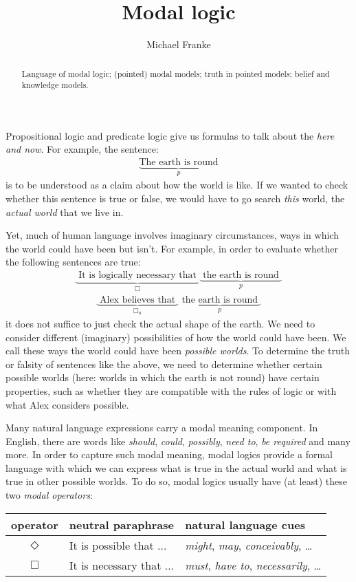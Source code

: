 \documentclass[nobib,nofonts]{tufte-handout}
\title{Modal logic}
\author{Michael Franke}
\date{} %
\begin{document}
\maketitle

\begin{abstract}
\noindent
Language of modal logic;
(pointed) modal models;
truth in pointed models;
belief and knowledge models.
\end{abstract}

\noindent Propositional logic and predicate logic give us formulas to talk about the \emph{here and now}.
For example, the sentence:
%
\begin{align*}
  \underbrace{\text{The earth is round}}_{p}
\end{align*}
%
is to be understood as a claim about how the world is like.
If we wanted to check whether this sentence is true or false, we would have to go search \emph{this} world, the \emph{actual world} that we live in.

Yet, much of human language involves imaginary circumstances, ways in which the world could have been but isn't.
For example, in order to evaluate whether the following sentences are true:
\begin{align*}
  \underbrace{\text{ It is logically necessary that }}_{\Box}
  \underbrace{\text{ the earth is round }}_{p}
\end{align*}
\begin{align*}
  \underbrace{\text{ Alex believes that }}_{\Box_{a}}
  \underbrace{\text{ the earth is round }}_{p}
\end{align*}
it does not suffice to just check the actual shape of the earth.
We need to consider different (imaginary) possibilities of how the world could have been.
We call these ways the world could have been \emph{possible worlds}.
To determine the truth or falsity of sentences like the above, we need to determine whether certain possible worlds (here: worlds in which the earth is not round) have certain properties, such as whether they are compatible with the rules of logic or with what Alex considers possible.

Many natural language expressions carry a modal meaning component.
In English, there are words like \emph{should}, \emph{could}, \emph{possibly}, \emph{need to}, \emph{be required} and many more.
In order to capture such modal meaning, modal logics provide a formal language with which we can express what is true in the actual world and what is true in other possible worlds.
To do so, modal logics usually have (at least) these two \emph{modal operators}:
\begin{center}
  \begin{tabular}{cll}
    operator   & neutral paraphrase & natural language cues \\ \hline
    $\Diamond$ & It is possible that ... & \emph{might}, \emph{may}, \emph{conceivably}, \dots \\
    $\Box$     & It is necessary that ... & \emph{must}, \emph{have to}, \emph{necessarily}, \dots \\
  \end{tabular}
\end{center}
\end{document}
